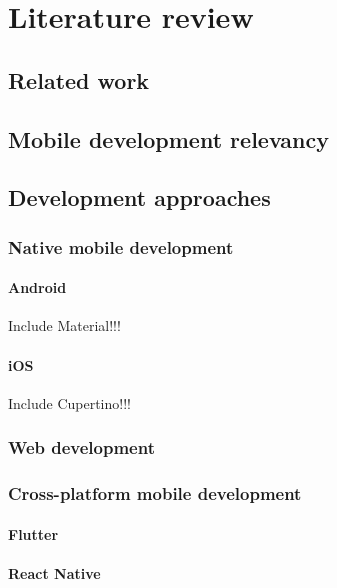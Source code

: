 
\chapter{Literature review}

\section{Related work}

\section{Mobile development relevancy}

\section{Development approaches}

\subsection{Native mobile development}

\subsubsection{Android}
Include Material!!!

\subsubsection{iOS}
Include Cupertino!!!

\subsection{Web development}

\subsection{Cross-platform mobile development}

\subsubsection{Flutter}
\subsubsection{React Native}
